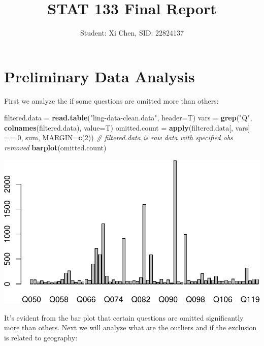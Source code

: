 \documentclass[]{article}
\title{STAT 133 Final Report }
\author{Student: Xi Chen, SID: 22824137}
\date{}
\newenvironment{Shaded}{\begin{snugshade}}{\end{snugshade}}
\newcommand{\KeywordTok}[1]{\textcolor[rgb]{0.13,0.29,0.53}{\textbf{{#1}}}}
\newcommand{\DataTypeTok}[1]{\textcolor[rgb]{0.13,0.29,0.53}{{#1}}}
\newcommand{\DecValTok}[1]{\textcolor[rgb]{0.00,0.00,0.81}{{#1}}}
\newcommand{\StringTok}[1]{\textcolor[rgb]{0.31,0.60,0.02}{{#1}}}
\newcommand{\CommentTok}[1]{\textcolor[rgb]{0.56,0.35,0.01}{\textit{{#1}}}}
\newcommand{\NormalTok}[1]{{#1}}
\begin{document}
\normalsize



\maketitle


\section{Preliminary Data Analysis}\label{preliminary-data-analysis}

First we analyze the if some questions are omitted more than others:

\begin{Shaded}
\begin{Highlighting}[]
\NormalTok{filtered.data =}\StringTok{ }\KeywordTok{read.table}\NormalTok{(}\StringTok{"ling-data-clean.data"}\NormalTok{, }\DataTypeTok{header=}\NormalTok{T)}
\NormalTok{vars =}\StringTok{ }\KeywordTok{grep}\NormalTok{(}\StringTok{"Q"}\NormalTok{, }\KeywordTok{colnames}\NormalTok{(filtered.data), }\DataTypeTok{value=}\NormalTok{T)}
\NormalTok{omitted.count =}\StringTok{ }\KeywordTok{apply}\NormalTok{(filtered.data[, vars] ==}\StringTok{ }\DecValTok{0}\NormalTok{, sum, }\DataTypeTok{MARGIN=}\KeywordTok{c}\NormalTok{(}\DecValTok{2}\NormalTok{)) }\CommentTok{# filtered.data is raw data with specified obs removed}
\KeywordTok{barplot}\NormalTok{(omitted.count)}
\end{Highlighting}
\end{Shaded}

\includegraphics{./writeup_files/figure-latex/unnamed-chunk-1.pdf}

It's evident from the bar plot that certain questions are omitted
significantly more than others. Next we will analyze what are the
outliers and if the exclusion is related to geography:
\end{document}
